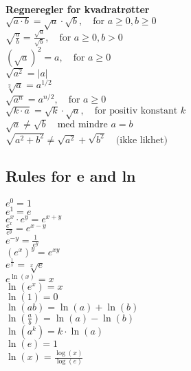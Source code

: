 \documentclass[a4paper,7pt,fleqn]{article}
\begin{document}
\begin{multicols}{3}
\begin{minipage}{\linewidth}
    \textbf{Regneregler for kvadratrøtter} \\
    \(\sqrt{a \cdot b} = \sqrt{a} \cdot \sqrt{b}, \quad \text{for } a \geq 0, b \geq 0\) \\
    \(\sqrt{\frac{a}{b}} = \frac{\sqrt{a}}{\sqrt{b}}, \quad \text{for } a \geq 0, b > 0\) \\
    \((\sqrt{a})^2 = a, \quad \text{for } a \geq 0\) \\
    \(\sqrt{a^2} = |a|\) \\
    \(\sqrt[2]{a} = a^{1/2}\) \\
    \(\sqrt{a^n} = a^{n/2}, \quad \text{for } a \geq 0\) \\
    \(\sqrt{k \cdot a} = \sqrt{k} \cdot \sqrt{a}, \quad \text{for positiv konstant } k\) \\
    \(\sqrt{a} \neq \sqrt{b} \quad \text{med mindre } a = b\) \\
    \(\sqrt{a^2 + b^2} \neq \sqrt{a^2} + \sqrt{b^2} \quad \text{(ikke likhet)}\)
\end{minipage}

\begin{minipage}{\linewidth}
\subsection{Rules for e and ln}
\(e^0 = 1\) \\
\(e^1 = e\) \\
\(e^x \cdot e^y = e^{x+y}\) \\
\(\frac{e^x}{e^y} = e^{x-y}\) \\
\(e^{-y} = \frac{1}{e^y}\) \\
\((e^x)^y = e^{xy}\) \\
\(e^{\frac{1}{x}} = \sqrt[x]{e}\) \\
\(e^{\ln(x)} = x\) \\
\(\ln(e^x) = x\) \\
\(\ln(1) = 0\) \\
\(\ln(ab) = \ln(a) + \ln(b)\) \\
\(\ln\left(\frac{a}{b}\right) = \ln(a) - \ln(b)\) \\
\(\ln(a^k) = k \cdot \ln(a)\) \\
\(\ln(e) = 1\) \\
\(\ln(x) = \frac{\log(x)}{\log(e)}\) \\

\end{minipage}

\end{multicols}
\end{document}
